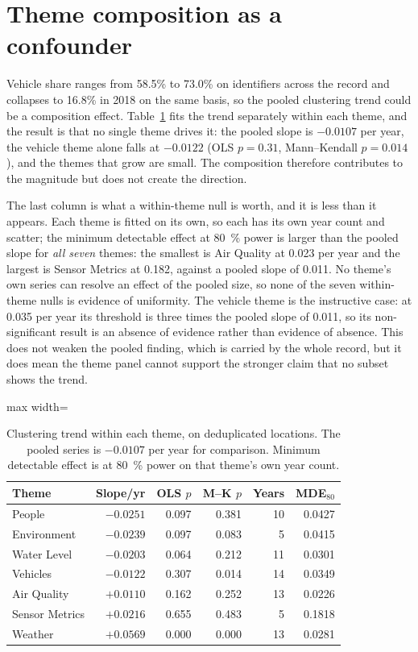 \documentclass[fleqn,10pt]{wlpeerj}
\begin{document}
\section{Theme composition as a confounder}
\label{si:theme}

Vehicle share ranges from 58.5\% to 73.0\% on identifiers across the record and collapses to
16.8\% in 2018 on the same basis,
so the pooled clustering trend could be a composition effect. Table~\ref{si:themetab} fits the
trend separately within each theme, and the result is that no single theme drives it: the
pooled slope is $-0.0107$ per year, the vehicle theme alone falls at $-0.0122$ (OLS $p = 0.31$,
Mann--Kendall $p = 0.014$), and the themes that grow are small. The composition therefore
contributes to the magnitude but does not create the direction.

The last column is what a within-theme null is worth, and it is less than it appears. Each
theme is fitted on its own, so each has its own year count and scatter; the minimum detectable
effect at \SI{80}{\percent} power is larger than the pooled slope for \emph{all seven} themes:
the smallest is Air Quality at \num{0.023} per year and the largest is Sensor Metrics at
\num{0.182}, against a pooled slope of \num{0.011}. No theme's own series can resolve an effect
of the pooled size, so none of the seven within-theme nulls is evidence of uniformity. The vehicle theme is the instructive case:
at \num{0.035} per year its threshold is three times the pooled slope of \num{0.011}, so its
non-significant result is an absence of evidence rather than evidence of absence. This does not
weaken the pooled finding, which is carried by the whole record, but it does mean the theme
panel cannot support the stronger claim that no subset shows the trend.

\begin{table}[H]
\centering
\caption{Clustering trend within each theme, on deduplicated locations. The pooled series is
$-0.0107$ per year for comparison. Minimum detectable effect is at \SI{80}{\percent} power on
that theme's own year count.}
\label{si:themetab}
\small
\begin{adjustbox}{max width=\linewidth}
\begin{tabular}{lrrrrr}
\toprule
Theme & Slope/yr & OLS $p$ & M--K $p$ & Years & MDE$_{80}$ \\
\midrule
People & $-0.0251$ & 0.097 & 0.381 & 10 & 0.0427 \\
Environment & $-0.0239$ & 0.097 & 0.083 & 5 & 0.0415 \\
Water Level & $-0.0203$ & 0.064 & 0.212 & 11 & 0.0301 \\
Vehicles & $-0.0122$ & 0.307 & 0.014 & 14 & 0.0349 \\
Air Quality & $+0.0110$ & 0.162 & 0.252 & 13 & 0.0226 \\
Sensor Metrics & $+0.0216$ & 0.655 & 0.483 & 5 & 0.1818 \\
Weather & $+0.0569$ & 0.000 & 0.000 & 13 & 0.0281 \\
\bottomrule
\end{tabular}
\end{adjustbox}
\end{table}
\end{document}
